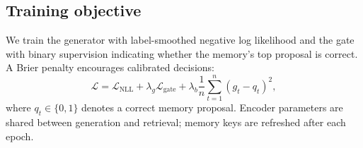 \subsection{Training objective}

We train the generator with label-smoothed negative log likelihood and the
gate with binary supervision indicating whether the memory's top proposal is
correct. A Brier penalty encourages calibrated decisions:
\begin{equation}
  \mathcal{L}=\mathcal{L}_{\mathrm{NLL}}
  +\lambda_g\mathcal{L}_{\mathrm{gate}}
  +\lambda_b\frac{1}{n}\sum_{t=1}^{n}(g_t-q_t)^2,
  \label{eq:loss}
\end{equation}
where $q_t\in\{0,1\}$ denotes a correct memory proposal. Encoder parameters
are shared between generation and retrieval; memory keys are refreshed after
each epoch.

